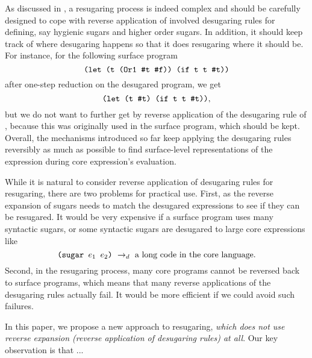 As discussed in \cite{resugaring,hygienic}, a resugaring process is indeed complex and should be carefully designed to cope with reverse application of involved desugaring rules for defining, say hygienic sugars and higher order sugars. In addition, it should keep track of where desugaring happens so that it does resugaring where it should be. For instance, for the following surface program
\[
\texttt{(let (t (Or1 \#t \#f)) (if t t \#t))}
\]
after one-step reduction on the desugared program, we get
\[
\texttt{(let (t \#t) (if t t \#t))},
\]
but we do not want to further get  by reverse application of the desugaring rule of , because this  was originally used in the surface program, which should be kept.
Overall, the mechanisms introduced so far keep applying the desugaring rules reversibly as much as possible to find surface-level representations of the expression during core expression's evaluation.

While it is natural to consider reverse application of desugaring rules for resugaring, there are two problems for practical use. First, as the reverse expansion of sugars needs to match the desugared expressions to see if they can be resugared. It would be very expensive if a surface program uses many syntactic sugars, or some syntactic sugars are desugared to large core expressions like
\[
\texttt{(sugar $e_1$ $e_2$)} ~\rightarrow_d~ \mbox{a long code in the core language}.
\]
Second, in the resugaring process, many core programs cannot be reversed  back to surface programs, which means that many reverse applications of the desugaring rules actually fail. It would be more efficient if we could avoid such failures.




\label{mark:mention}
In this paper, we propose a new approach to resugaring, \emph{which does not use reverse expansion (reverse application of desugaring rules) at all}. Our key observation is that
...


